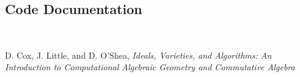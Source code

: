 \documentclass{amsart}
\theoremstyle{definition}
\theoremstyle{remark}
\numberwithin{equation}{section}
\begin{document}
\subsection*{Code Documentation}

\leavevmode \\


\begin{thebibliography}{99}
  D. Cox, J. Little, and D. O'Shea, {\em Ideals, Varieties, and Algorithms: An Introduction to Computational Algebraic Geometry and Commutative Algebra}
\end{thebibliography}
\end{document}
